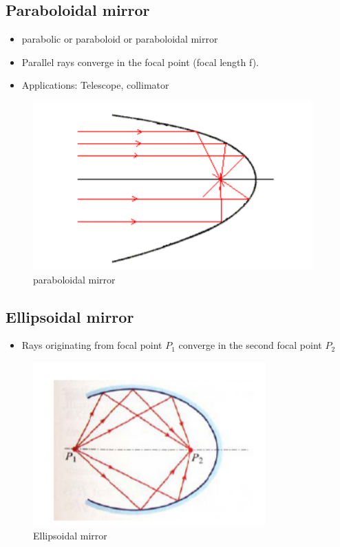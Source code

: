 \documentclass[../main.tex]{subfiles}
\begin{document}
	\subsection{Paraboloidal mirror}
	\begin{itemize}  
	\item parabolic or paraboloid or paraboloidal mirror
	\item Parallel rays converge in the focal point (focal length f).
	\item Applications: Telescope, collimator
	\end{itemize}
	\begin{figure}[h!]
	  \centering
	  \includegraphics[scale=0.7]{../graphics/Optical_components2.png}
	  \caption{paraboloidal mirror}
	  \label{fig:mirror2}
	\end{figure}

	\subsection{Ellipsoidal mirror}
	\begin{itemize}  
	\item Rays originating from focal point $P_1$ converge in the second focal point $P_2$
	\end{itemize}
	\begin{figure}[h!]
	  \centering
	  \includegraphics[scale=0.7]{../graphics/Optical_components3.png}
	  \caption{Ellipsoidal mirror}
	  \label{fig:mirror3}
	\end{figure}
	\FloatBarrier
\end{document}
